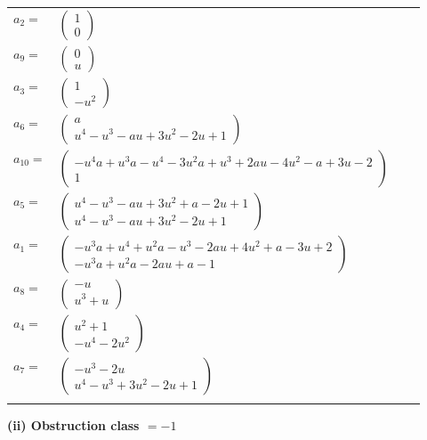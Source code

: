 \documentclass[1p]{elsarticle_modified}
\theoremstyle{definition}
\begin{document}
\begin{tabular}{m{7pt} m{180pt} m{7pt} m{180pt} }
\flushright $a_{2}=$&$\begin{pmatrix}1\\0\end{pmatrix}$ \\
\flushright $a_{9}=$&$\begin{pmatrix}0\\u\end{pmatrix}$ \\
\flushright $a_{3}=$&$\begin{pmatrix}1\\- u^2\end{pmatrix}$ \\
\flushright $a_{6}=$&$\begin{pmatrix}a\\u^4- u^3- a u+3 u^2-2 u+1\end{pmatrix}$ \\
\flushright $a_{10}=$&$\begin{pmatrix}- u^4 a+u^3 a- u^4-3 u^2 a+u^3+2 a u-4 u^2- a+3 u-2\\1\end{pmatrix}$ \\
\flushright $a_{5}=$&$\begin{pmatrix}u^4- u^3- a u+3 u^2+a-2 u+1\\u^4- u^3- a u+3 u^2-2 u+1\end{pmatrix}$ \\
\flushright $a_{1}=$&$\begin{pmatrix}- u^3 a+u^4+u^2 a- u^3-2 a u+4 u^2+a-3 u+2\\- u^3 a+u^2 a-2 a u+a-1\end{pmatrix}$ \\
\flushright $a_{8}=$&$\begin{pmatrix}- u\\u^3+u\end{pmatrix}$ \\
\flushright $a_{4}=$&$\begin{pmatrix}u^2+1\\- u^4-2 u^2\end{pmatrix}$ \\
\flushright $a_{7}=$&$\begin{pmatrix}- u^3-2 u\\u^4- u^3+3 u^2-2 u+1\end{pmatrix}$\\&\end{tabular}
\flushleft \textbf{(ii) Obstruction class $= -1$}\\~\\
\end{document}

